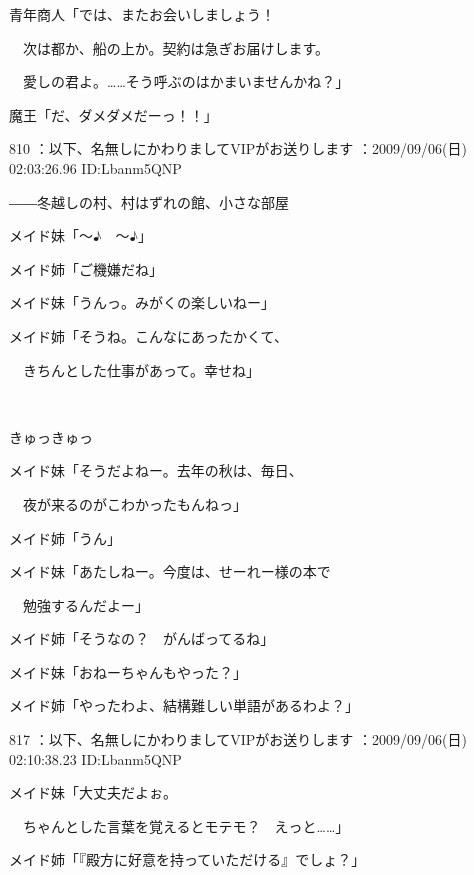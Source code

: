 \documentclass[a4j,twocolumn]{tarticle}
\begin{document}
青年商人「では、またお会いしましょう！\par{}
　次は都か、船の上か。契約は急ぎお届けします。 \par{}
　愛しの君よ。……そう呼ぶのはかまいませんかね？」 



魔王「だ、ダメダメだーっ！！」 

	
    
    

810 ：以下、名無しにかわりましてVIPがお送りします ：2009/09/06(日) 02:03:26.96 ID:Lbanm5QNP 


――冬越しの村、村はずれの館、小さな部屋 



メイド妹「～♪　～♪」\par{} 
メイド姉「ご機嫌だね」 



メイド妹「うんっ。みがくの楽しいねー」\par{} 
メイド姉「そうね。こんなにあったかくて、\par{} 
　きちんとした仕事があって。幸せね」 

　

きゅっきゅっ 



メイド妹「そうだよねー。去年の秋は、毎日、\par{} 
　夜が来るのがこわかったもんねっ」 



メイド姉「うん」 



メイド妹「あたしねー。今度は、せーれー様の本で\par{} 
　勉強するんだよー」 



メイド姉「そうなの？　がんばってるね」 



メイド妹「おねーちゃんもやった？」\par{} 
メイド姉「やったわよ、結構難しい単語があるわよ？」 

	
    
    

817 ：以下、名無しにかわりましてVIPがお送りします ：2009/09/06(日) 02:10:38.23 ID:Lbanm5QNP 


メイド妹「大丈夫だよぉ。\par{} 
　ちゃんとした言葉を覚えるとモテモ？　えっと……」 \par{}
メイド姉「『殿方に好意を持っていただける』でしょ？」 
\end{document}
